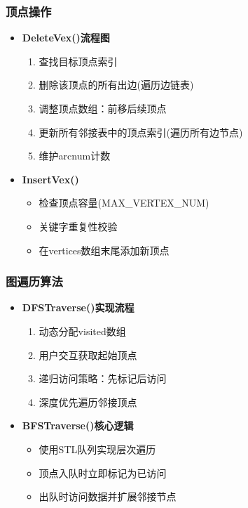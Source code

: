 \documentclass[supercite]{Experimental_Report}
\theoremstyle{definition}
\begin{document}
\subsubsection*{顶点操作}
\begin{itemize}
    \item \textbf{DeleteVex()流程图}
    \begin{enumerate}
        \item 查找目标顶点索引
        \item 删除该顶点的所有出边(遍历边链表)
        \item 调整顶点数组：前移后续顶点
        \item 更新所有邻接表中的顶点索引(遍历所有边节点)
        \item 维护arcnum计数
    \end{enumerate}
    
    \item \textbf{InsertVex()}
    \begin{itemize}
        \item 检查顶点容量(MAX\_VERTEX\_NUM)
        \item 关键字重复性校验
        \item 在vertices数组末尾添加新顶点
    \end{itemize}
\end{itemize}

\subsubsection*{图遍历算法}
\begin{itemize}
    \item \textbf{DFSTraverse()实现流程}
    \begin{enumerate}
        \item 动态分配visited数组
        \item 用户交互获取起始顶点
        \item 递归访问策略：先标记后访问
        \item 深度优先遍历邻接顶点
    \end{enumerate}
    
    \item \textbf{BFSTraverse()核心逻辑}
    \begin{itemize}
        \item 使用STL队列实现层次遍历
        \item 顶点入队时立即标记为已访问
        \item 出队时访问数据并扩展邻接节点
    \end{itemize}
\end{itemize}
\end{document}
